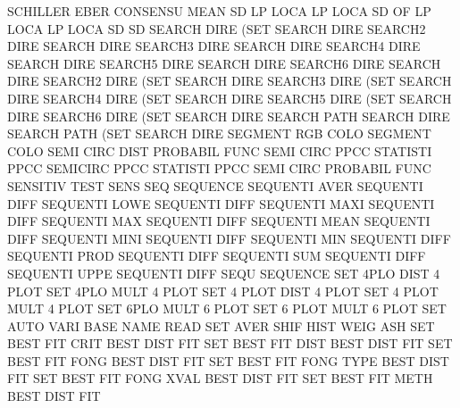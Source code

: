 SCHILLER EBER                           CONSENSU MEAN
SD       LP   LOCA                      LP       LOCA
SD       OF   LP   LOCA                 LP       LOCA
SD                                      SD
SEARCH   DIRE (SET                      SEARCH   DIRE
SEARCH2  DIRE                           SEARCH   DIRE
SEARCH3  DIRE                           SEARCH   DIRE
SEARCH4  DIRE                           SEARCH   DIRE
SEARCH5  DIRE                           SEARCH   DIRE
SEARCH6  DIRE                           SEARCH   DIRE
SEARCH2  DIRE (SET                      SEARCH   DIRE
SEARCH3  DIRE (SET                      SEARCH   DIRE
SEARCH4  DIRE (SET                      SEARCH   DIRE
SEARCH5  DIRE (SET                      SEARCH   DIRE
SEARCH6  DIRE (SET                      SEARCH   DIRE
SEARCH   PATH                           SEARCH   DIRE
SEARCH   PATH (SET                      SEARCH   DIRE
SEGMENT  RGB  COLO                      SEGMENT  COLO
SEMI     CIRC DIST                      PROBABIL FUNC
SEMI     CIRC PPCC                      STATISTI PPCC
SEMICIRC PPCC                           STATISTI PPCC
SEMI     CIRC                           PROBABIL FUNC
SENSITIV                                TEST     SENS
SEQ                                     SEQUENCE
SEQUENTI AVER                           SEQUENTI DIFF
SEQUENTI LOWE                           SEQUENTI DIFF
SEQUENTI MAXI                           SEQUENTI DIFF
SEQUENTI MAX                            SEQUENTI DIFF
SEQUENTI MEAN                           SEQUENTI DIFF
SEQUENTI MINI                           SEQUENTI DIFF
SEQUENTI MIN                            SEQUENTI DIFF
SEQUENTI PROD                           SEQUENTI DIFF
SEQUENTI SUM                            SEQUENTI DIFF
SEQUENTI UPPE                           SEQUENTI DIFF
SEQU                                    SEQUENCE
SET      4PLO DIST                      4        PLOT
SET      4PLO MULT                      4        PLOT
SET      4    PLOT DIST                 4        PLOT
SET      4    PLOT MULT                 4        PLOT
SET      6PLO MULT                      6        PLOT
SET      6    PLOT MULT                 6        PLOT
SET      AUTO VARI BASE NAME            READ
SET      AVER SHIF HIST WEIG            ASH
SET      BEST FIT  CRIT                 BEST     DIST FIT
SET      BEST FIT  DIST                 BEST     DIST FIT
SET      BEST FIT  FONG                 BEST     DIST FIT
SET      BEST FIT  FONG TYPE            BEST     DIST FIT
SET      BEST FIT  FONG XVAL            BEST     DIST FIT
SET      BEST FIT  METH                 BEST     DIST FIT
